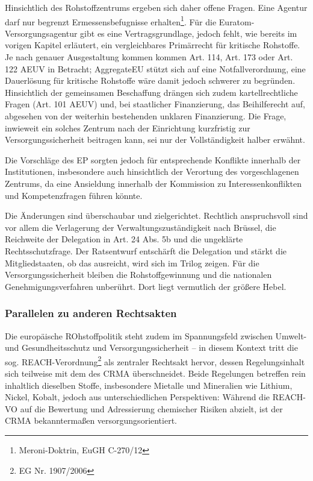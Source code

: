 \documentclass[12pt,a4paper,oneside]{book} %
\begin{document}
Hinsichtlich des Rohstoffzentrums ergeben sich daher offene Fragen. Eine Agentur darf nur begrenzt Ermessensbefugnisse erhalten\footnote{Meroni-Doktrin, EuGH C-270/12}. Für die Euratom-Versorgungsagentur gibt es eine Vertragsgrundlage, jedoch fehlt, wie bereits im vorigen Kapitel erläutert, ein vergleichbares Primärrecht für kritische Rohstoffe. Je nach genauer Ausgestaltung kommen kommen Art. 114, Art. 173 oder Art. 122 AEUV in Betracht; AggregateEU stützt sich auf eine Notfallverordnung, eine Dauerlösung für kritische Rohstoffe wäre damit jedoch schwerer zu begründen. Hinsichtlich der gemeinsamen Beschaffung drängen sich zudem kartellrechtliche Fragen (Art. 101 AEUV) und, bei staatlicher Finanzierung, das Beihilferecht auf, abgesehen von der weiterhin bestehenden unklaren Finanzierung. Die Frage, inwieweit ein solches Zentrum nach der Einrichtung kurzfristig zur Versorgungssicherheit beitragen kann, sei nur der Vollständigkeit halber erwähnt.

Die Vorschläge des EP sorgten jedoch für entsprechende Konflikte innerhalb der Institutionen, insbesondere auch hinsichtlich der Verortung des vorgeschlagenen Zentrums, da eine Ansieldung innerhalb der Kommission zu Interessenkonflikten und Kompetenzfragen führen könnte.\autocite{https://background.tagesspiegel.de/verkehr-und-smart-mobility/briefing/streit-um-eu-rohstoffzentrum}

Die Änderungen sind überschaubar und zielgerichtet. Rechtlich anspruchsvoll sind vor allem die Verlagerung der Verwaltungszuständigkeit nach Brüssel, die Reichweite der Delegation in Art. 24 Abs. 5b und die ungeklärte Rechtsschutzfrage. Der Ratsentwurf entschärft die Delegation und stärkt die Mitgliedstaaten, ob das ausreicht, wird sich im Trilog zeigen. Für die Versorgungssicherheit bleiben die Rohstoffgewinnung und die nationalen Genehmigungsverfahren unberührt. Dort liegt vermutlich der größere Hebel.


\subsubsection{Parallelen zu anderen Rechtsakten}
Die europäische ROhstoffpolitik steht zudem im Spannungsfeld zwischen Umwelt- und Gesundheitsschutz und Versorgungssicherheit -- in diesem Kontext tritt die sog. REACH-Verordnung\footnote{EG Nr. 1907/2006} als zentraler Rechtsakt hervor, dessen Regelungsinhalt sich teilweise mit dem des CRMA überschneidet. Beide Regelungen betreffen rein inhaltlich dieselben Stoffe, insbesondere Mietalle und Mineralien wie Lithium, Nickel, Kobalt, jedoch aus unterschiedlichen Perspektiven: Während die REACH-VO auf die Bewertung und Adressierung chemischer Risiken abzielt, ist der CRMA bekanntermaßen versorgungsorientiert. 
\end{document}
